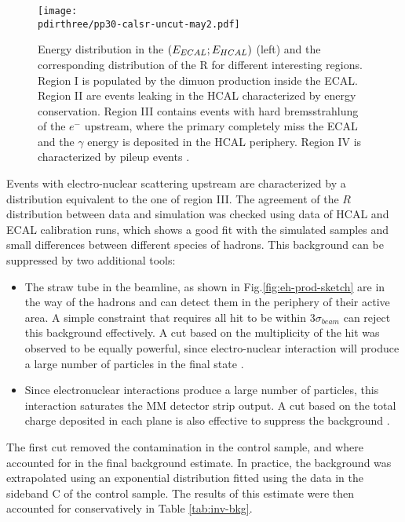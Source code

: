 \begin{figure}[bth!]
  \centering
  \texttt{[image: \\pdirthree/pp30-calsr-uncut-may2.pdf]}
  \caption[R value for control sample]{Energy distribution in the $(E_{ECAL};E_{HCAL})$ (left) and the corresponding distribution of the R for different interesting regions. Region I is populated by the dimuon production inside the ECAL. Region II are events leaking in the HCAL characterized by energy conservation. Region III contains events with hard bremsstrahlung of the $e^-$ upstream, where the primary completely miss the ECAL and the $\gamma$ energy is deposited in the HCAL periphery. Region IV is characterized by pileup events \cite{pdegen-thesis}.}
  \label{fig:r-value-csample}
\end{figure}

Events with electro-nuclear scattering upstream are characterized by a distribution equivalent to the one of region III. The agreement of the $R$ distribution between data and simulation was checked using data of HCAL and ECAL calibration runs, which shows a good fit with the simulated samples and small differences between different species of hadrons. This background can be suppressed by two additional tools:

\begin{itemize}
\item The straw tube in the beamline, as shown in Fig.\ref{fig:eh-prod-sketch} are in the way of the hadrons and can detect them in the periphery of their active area. A simple constraint that requires all hit to be within 3$\sigma_{beam}$ can reject this background effectively. A cut based on the multiplicity of the hit was observed to be equally powerful, since electro-nuclear interaction will produce a large number of particles in the final state \cite{pdegen-thesis}.
\item Since electronuclear interactions produce a large number of particles, this interaction saturates the MM detector strip output. A cut based on the total charge deposited in each plane is also effective to suppress the background \cite{na64-invisible-cuts}.
\end{itemize}

The first cut removed the contamination in the control sample, and where accounted for in the final background estimate. In practice, the background was extrapolated using an exponential distribution fitted using the data in the sideband C of the control sample. The results of this estimate were then accounted for conservatively in Table \ref{tab:inv-bkg}.

